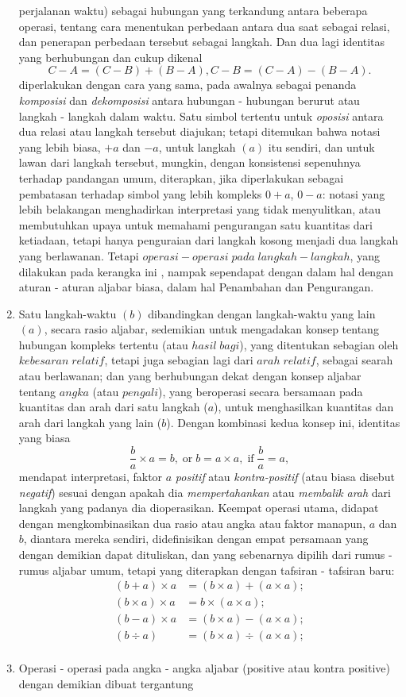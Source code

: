 \documentclass[a4paper, 12pt]{book}
\begin{document}
\begin{enumerate}
perjalanan waktu) sebagai hubungan yang terkandung antara beberapa operasi,
tentang  cara menentukan perbedaan antara dua saat sebagai relasi, dan 
penerapan perbedaan tersebut sebagai langkah. Dan dua lagi identitas yang 
berhubungan dan cukup dikenal
\[
C - A = (C - B) + (B - A), C - B = (C - A) - (B - A).
\]
diperlakukan dengan cara yang sama, pada awalnya sebagai penanda 
\textit{komposisi} dan \textit{dekomposisi} antara hubungan - hubungan berurut
atau langkah - langkah dalam waktu. Satu simbol tertentu untuk \textit{oposisi}
antara dua relasi atau langkah tersebut diajukan; tetapi ditemukan bahwa
notasi yang lebih biasa, $+a$ dan $-a$, untuk langkah $(a)$ itu sendiri, dan
untuk lawan dari langkah tersebut, mungkin, dengan konsistensi sepenuhnya 
terhadap pandangan umum, diterapkan, jika diperlakukan sebagai pembatasan
terhadap simbol yang lebih kompleks $0 + a$, $0 - a$: notasi yang lebih 
belakangan menghadirkan interpretasi yang tidak menyulitkan, atau membutuhkan
upaya untuk memahami pengurangan satu kuantitas dari ketiadaan, tetapi hanya
penguraian dari langkah kosong menjadi dua langkah yang berlawanan. Tetapi 
$operasi - operasi \; pada \; langkah - langkah$, yang dilakukan pada kerangka ini
, nampak sependapat dengan dalam hal dengan aturan - aturan aljabar biasa, 
dalam hal Penambahan dan Pengurangan.
\item Satu langkah-waktu $(b)$ dibandingkan dengan langkah-waktu yang lain
$(a)$, secara rasio aljabar, sedemikian untuk mengadakan konsep tentang
hubungan kompleks tertentu (atau $hasil\; bagi$), yang ditentukan sebagian oleh
$kebesaran\; relatif$, tetapi juga sebagian lagi dari $arah\; relatif$, sebagai
searah atau berlawanan; dan yang berhubungan dekat dengan konsep aljabar 
tentang $angka$ (atau $pengali$), yang beroperasi secara bersamaan pada
kuantitas dan arah dari satu langkah ($a$), untuk 
menghasilkan kuantitas dan arah dari langkah yang lain ($b$). Dengan kombinasi
kedua konsep ini, identitas yang biasa
\[
\frac{b}{a} \times a = b, \; \text{or} \;  b = a \times a, \;\text{if} \; \frac{b}{a}=a,
\] 
mendapat interpretasi, faktor $a$ \textit{positif} atau 
\textit{kontra-positif} (atau biasa disebut \textit{negatif}) sesuai dengan
apakah dia \textit{mempertahankan} atau \textit{membalik} \textit{arah} dari
langkah yang padanya dia dioperasikan. Keempat operasi utama, didapat dengan 
mengkombinasikan dua rasio atau angka atau faktor manapun, $a$ dan $b$, 
diantara mereka sendiri, didefinisikan dengan empat persamaan yang dengan
demikian dapat dituliskan, dan yang sebenarnya dipilih dari rumus - rumus
aljabar umum, tetapi yang diterapkan dengan tafsiran - tafsiran baru:
\begin{align*}
(b + a) \times a  &= (b \times a) + (a \times a); \\
(b \times a) \times a  &= b \times (a \times a); \\
(b - a) \times a  &= (b \times a) - (a \times a); \\
(b \div a) &= (b \times a) \div (a \times a); \\
\end{align*}
\item Operasi - operasi pada angka - angka aljabar (positive atau kontra
positive) dengan demikian dibuat tergantung

\end{enumerate}
\end{document}
